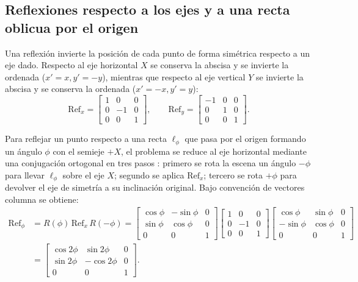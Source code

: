 \documentclass[a4paper,10pt]{article}
\begin{document}
\subsection{Reflexiones respecto a los ejes y a una recta oblicua por el origen}

Una reflexión invierte la posición de cada punto de forma simétrica respecto a un eje dado. Respecto al eje horizontal $X$ se conserva la abscisa y se invierte la ordenada ($x'=x, y'=-y$), mientras que respecto al eje vertical $Y$ se invierte la abscisa y se conserva la ordenada ($x'=-x, y'=y$):
\begin{equation}
  \mathrm{Ref}_x = \begin{bmatrix} 1 & 0 & 0 \\ 0 & -1 & 0 \\ 0 & 0 & 1 \end{bmatrix}, \qquad
  \mathrm{Ref}_y = \begin{bmatrix} -1 & 0 & 0 \\ 0 & 1 & 0 \\ 0 & 0 & 1 \end{bmatrix}.
\end{equation}

Para reflejar un punto respecto a una recta $\ell_\phi$ que pasa por el origen formando un ángulo $\phi$ con el semieje $+X$, el problema se reduce al eje horizontal mediante una conjugación ortogonal en tres pasos \citep{vince2012}: primero se rota la escena un ángulo $-\phi$ para llevar $\ell_\phi$ sobre el eje $X$; segundo se aplica $\mathrm{Ref}_x$; tercero se rota $+\phi$ para devolver el eje de simetría a su inclinación original. Bajo convención de vectores columna se obtiene:
\begin{equation}
\begin{aligned}
  \mathrm{Ref}_\phi &= R(\phi)\,\mathrm{Ref}_x\,R(-\phi)
  = \begin{bmatrix} \cos\phi & -\sin\phi & 0 \\ \sin\phi & \cos\phi & 0 \\ 0 & 0 & 1 \end{bmatrix}
    \begin{bmatrix} 1 & 0 & 0 \\ 0 & -1 & 0 \\ 0 & 0 & 1 \end{bmatrix}
    \begin{bmatrix} \cos\phi & \sin\phi & 0 \\ -\sin\phi & \cos\phi & 0 \\ 0 & 0 & 1 \end{bmatrix} \\
  &= \begin{bmatrix} \cos 2\phi & \sin 2\phi & 0 \\ \sin 2\phi & -\cos 2\phi & 0 \\ 0 & 0 & 1 \end{bmatrix}.
\end{aligned}
\end{equation}
\end{document}
